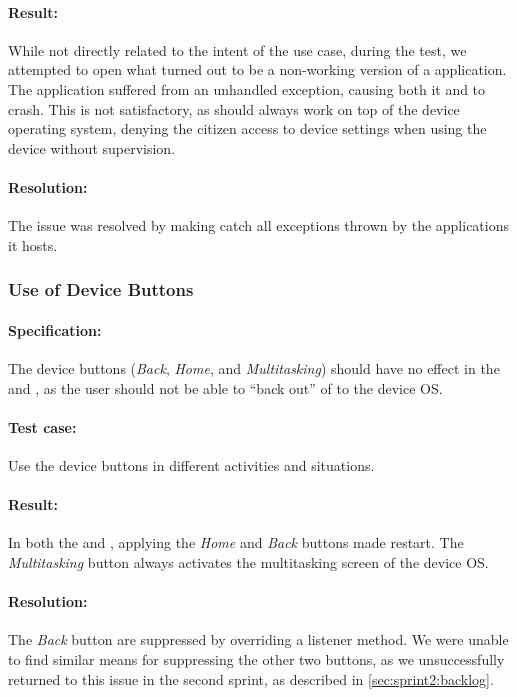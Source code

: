 \paragraph{Result:} While not directly related to the intent of the use case, during the test, we attempted to open what turned out to be a non-working version of a \giraf application. 
The application suffered from an unhandled exception, causing both it and \launcher to crash. 
This is not satisfactory, as \launcher should always work on top of the device operating system, denying the citizen access to device settings when using the device without supervision.
\paragraph{Resolution:} The issue was resolved by making \launcher catch all exceptions thrown by the \giraf applications it hosts.

\subsubsection{Use of Device Buttons}

\paragraph{Specification:} The device buttons (\textit{Back}, \textit{Home}, and \textit{Multitasking}) should have no effect in the \mainactivity and \authenticationactivity, as the user should not be able to ``back out'' of \launcher to the device OS.
\paragraph{Test case:} Use the device buttons in different activities and situations.
\paragraph{Result:} In both the \mainactivity and \authenticationactivity, applying the \textit{Home} and \textit{Back} buttons made \launcher restart. 
The \textit{Multitasking} button always activates the multitasking screen of the device OS.
\paragraph{Resolution:} The \textit{Back} button are suppressed by overriding a listener method.
We were unable to find similar means for suppressing the other two buttons, as we unsuccessfully returned to this issue in the second sprint, as described in \cref{sec:sprint2:backlog}.
